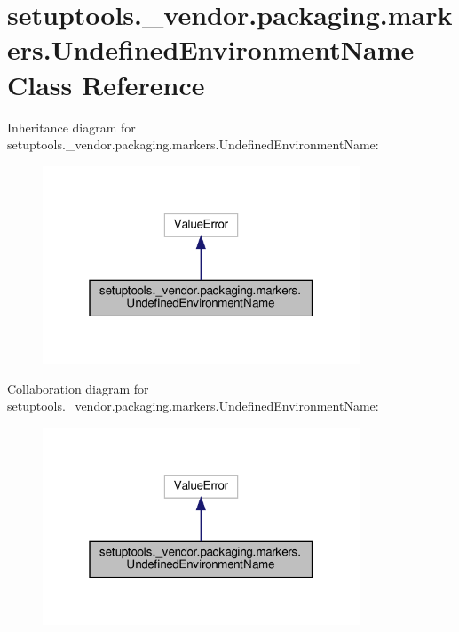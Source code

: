 \hypertarget{classsetuptools_1_1__vendor_1_1packaging_1_1markers_1_1UndefinedEnvironmentName}{}\section{setuptools.\+\_\+vendor.\+packaging.\+markers.\+Undefined\+Environment\+Name Class Reference}
\label{classsetuptools_1_1__vendor_1_1packaging_1_1markers_1_1UndefinedEnvironmentName}


Inheritance diagram for setuptools.\+\_\+vendor.\+packaging.\+markers.\+Undefined\+Environment\+Name\+:
\nopagebreak
\begin{figure}[H]
\begin{center}
\leavevmode
\includegraphics[width=268pt]{classsetuptools_1_1__vendor_1_1packaging_1_1markers_1_1UndefinedEnvironmentName__inherit__graph}
\end{center}
\end{figure}


Collaboration diagram for setuptools.\+\_\+vendor.\+packaging.\+markers.\+Undefined\+Environment\+Name\+:
\nopagebreak
\begin{figure}[H]
\begin{center}
\leavevmode
\includegraphics[width=268pt]{classsetuptools_1_1__vendor_1_1packaging_1_1markers_1_1UndefinedEnvironmentName__coll__graph}
\end{center}
\end{figure}


